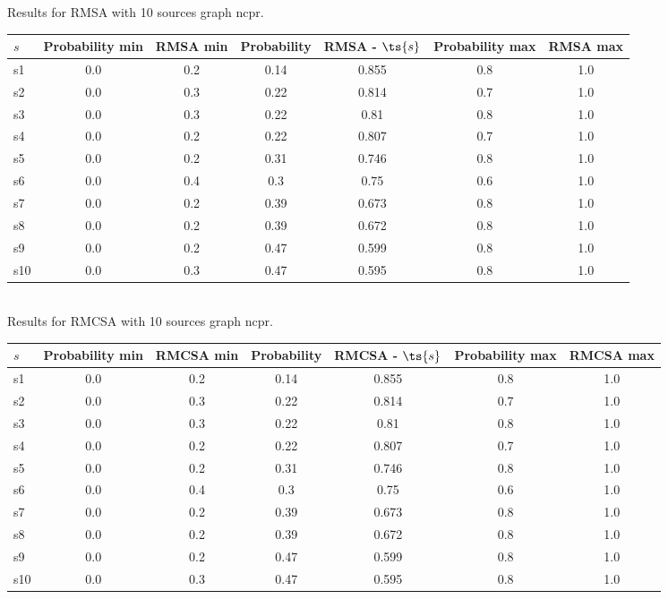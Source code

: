 \documentclass{article}
\begin{document}
\noindent Results for RMSA with 10 sources graph ncpr.

\noindent\begin{tabular}{|l|c|c|c|c|c|c|}
\hline
$s$& Probability min & RMSA min & Probability & RMSA - $\ts{s}$ & Probability max & RMSA max\\
\hline
s1 &0.0 & 0.2 & 0.14 & 0.855 & 0.8 & 1.0\\
\hline
s2 &0.0 & 0.3 & 0.22 & 0.814 & 0.7 & 1.0\\
\hline
s3 &0.0 & 0.3 & 0.22 & 0.81 & 0.8 & 1.0\\
\hline
s4 &0.0 & 0.2 & 0.22 & 0.807 & 0.7 & 1.0\\
\hline
s5 &0.0 & 0.2 & 0.31 & 0.746 & 0.8 & 1.0\\
\hline
s6 &0.0 & 0.4 & 0.3 & 0.75 & 0.6 & 1.0\\
\hline
s7 &0.0 & 0.2 & 0.39 & 0.673 & 0.8 & 1.0\\
\hline
s8 &0.0 & 0.2 & 0.39 & 0.672 & 0.8 & 1.0\\
\hline
s9 &0.0 & 0.2 & 0.47 & 0.599 & 0.8 & 1.0\\
\hline
s10 &0.0 & 0.3 & 0.47 & 0.595 & 0.8 & 1.0\\
\hline
\end{tabular}\\

\noindent Results for RMCSA with 10 sources graph ncpr.

\noindent\begin{tabular}{|l|c|c|c|c|c|c|}
\hline
$s$& Probability min & RMCSA min & Probability & RMCSA - $\ts{s}$ & Probability max & RMCSA max\\
\hline
s1 &0.0 & 0.2 & 0.14 & 0.855 & 0.8 & 1.0\\
\hline
s2 &0.0 & 0.3 & 0.22 & 0.814 & 0.7 & 1.0\\
\hline
s3 &0.0 & 0.3 & 0.22 & 0.81 & 0.8 & 1.0\\
\hline
s4 &0.0 & 0.2 & 0.22 & 0.807 & 0.7 & 1.0\\
\hline
s5 &0.0 & 0.2 & 0.31 & 0.746 & 0.8 & 1.0\\
\hline
s6 &0.0 & 0.4 & 0.3 & 0.75 & 0.6 & 1.0\\
\hline
s7 &0.0 & 0.2 & 0.39 & 0.673 & 0.8 & 1.0\\
\hline
s8 &0.0 & 0.2 & 0.39 & 0.672 & 0.8 & 1.0\\
\hline
s9 &0.0 & 0.2 & 0.47 & 0.599 & 0.8 & 1.0\\
\hline
s10 &0.0 & 0.3 & 0.47 & 0.595 & 0.8 & 1.0\\
\hline
\end{tabular}\\
\end{document}
